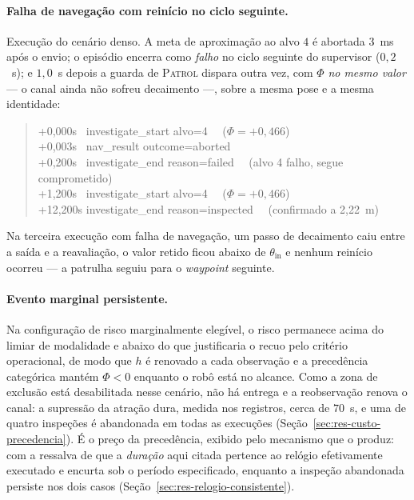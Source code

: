 \paragraph{Falha de navegação com reinício no ciclo seguinte.}
Execução do cenário denso. A meta de aproximação ao alvo $4$ é abortada $3$~ms após o
envio; o episódio encerra como \emph{falho} no ciclo seguinte do supervisor
($0{,}2$~s); e $1{,}0$~s depois a guarda de \textsc{Patrol} dispara outra vez, com
$\Phi$ \emph{no mesmo valor} --- o canal ainda não sofreu decaimento ---, sobre a mesma
pose e a mesma identidade:

\begin{quote}\footnotesize\ttfamily
+0{,}000\;s \ investigate\_start alvo=4 \ \ ($\Phi=+0{,}466$)\\
+0{,}003\;s \ nav\_result outcome=aborted\\
+0{,}200\;s \ investigate\_end reason=failed \ \ (alvo 4 falho, segue comprometido)\\
+1{,}200\;s \ investigate\_start alvo=4 \ \ ($\Phi=+0{,}466$)\\
+12{,}200\;s investigate\_end reason=inspected \ \ (confirmado a 2{,}22~m)
\end{quote}

Na terceira execução com falha de navegação, um passo de decaimento caiu entre a saída e
a reavaliação, o valor retido ficou abaixo de $\theta_{\text{in}}$ e nenhum reinício
ocorreu --- a patrulha seguiu para o \textit{waypoint} seguinte.

\paragraph{Evento marginal persistente.}
Na configuração de risco marginalmente elegível, o risco permanece acima do limiar de
modalidade e abaixo do que justificaria o recuo pelo critério operacional, de modo que
$h$ é renovado a cada observação e a precedência categórica mantém $\Phi<0$ enquanto o
robô está no alcance. Como a zona de exclusão está desabilitada nesse cenário, não há
entrega e a reobservação renova o canal: a supressão da atração dura, medida nos
registros, cerca de $70$~s, e uma de quatro inspeções é abandonada em todas as
execuções (Seção~\ref{sec:res-custo-precedencia}). É o preço da precedência, exibido
pelo mecanismo que o produz: com a ressalva de que a \emph{duração} aqui citada
pertence ao relógio efetivamente executado e encurta sob o período especificado,
enquanto a inspeção abandonada persiste nos dois casos
(Seção~\ref{sec:res-relogio-consistente}).

